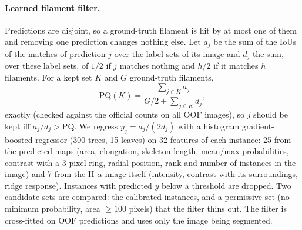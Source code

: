 \paragraph{Learned filament filter.}
Predictions are disjoint, so a ground-truth filament is hit by at most one
of them and removing one prediction changes nothing else. Let $a_j$ be the
sum of the IoUs of the matches of prediction $j$ over the label sets of its
image and $d_j$ the sum, over these label sets, of $1/2$ if $j$ matches
nothing and $h/2$ if it matches $h$ filaments. For a kept set $K$ and $G$
ground-truth filaments,
\[
  \mathrm{PQ}(K)=\frac{\sum_{j\in K}a_j}{G/2+\sum_{j\in K}d_j},
\]
exactly (checked against the official counts on all OOF images), so $j$
should be kept iff $a_j/d_j>\mathrm{PQ}$. We regress
$y_j=a_j/(2d_j)$ with a histogram gradient-boosted regressor
\cite{ke2017lightgbm,pedregosa2011sklearn} (300 trees, 15 leaves) on 32
features of each instance: 25 from the predicted maps (area, elongation,
skeleton length, mean/max probabilities, contrast with a 3-pixel ring,
radial position, rank and number of instances in the image) and 7 from the
H-$\alpha$ image itself (intensity, contrast with its surroundings, ridge
response). Instances with predicted $y$ below a threshold are dropped. Two
candidate sets are compared: the calibrated instances, and a permissive set
(no minimum probability, area $\ge100$ pixels) that the filter thins out.
The filter is cross-fitted on OOF predictions and uses only the image being
segmented.
